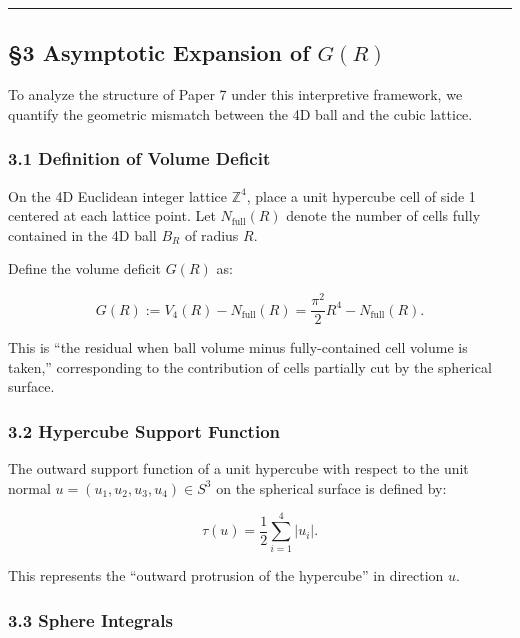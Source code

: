 \documentclass[
]{article}
\begin{document}
\begin{center}\rule{0.5\linewidth}{0.5pt}\end{center}

\subsection{\texorpdfstring{§3 Asymptotic Expansion of
\(G(R)\)}{§3 Asymptotic Expansion of G(R)}}\label{asymptotic-expansion-of-gr}

To analyze the structure of Paper 7 under this interpretive framework,
we quantify the geometric mismatch between the 4D ball and the cubic
lattice.

\subsubsection{3.1 Definition of Volume
Deficit}\label{definition-of-volume-deficit}

On the 4D Euclidean integer lattice \(\mathbb{Z}^4\), place a unit
hypercube cell of side 1 centered at each lattice point. Let
\(N_{\text{full}}(R)\) denote the number of cells fully contained in the
4D ball \(B_R\) of radius \(R\).

Define the volume deficit \(G(R)\) as:

\[G(R) := V_4(R) - N_{\text{full}}(R) = \frac{\pi^2}{2}R^4 - N_{\text{full}}(R). \tag{3.1}\]

This is ``the residual when ball volume minus fully-contained cell
volume is taken,'' corresponding to the contribution of cells partially
cut by the spherical surface.

\subsubsection{3.2 Hypercube Support
Function}\label{hypercube-support-function}

The outward support function of a unit hypercube with respect to the
unit normal \(u = (u_1, u_2, u_3, u_4) \in S^3\) on the spherical
surface is defined by:

\[\tau(u) = \frac{1}{2}\sum_{i=1}^{4} |u_i|. \tag{3.2}\]

This represents the ``outward protrusion of the hypercube'' in direction
\(u\).

\subsubsection{3.3 Sphere Integrals}\label{sphere-integrals}
\end{document}
